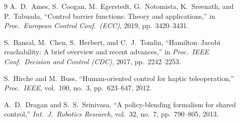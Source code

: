\documentclass[conference,letterpaper,10pt]{IEEEtran}
\begin{document}
\begin{thebibliography}{9}
  A.~D.~Ames, S.~Coogan, M.~Egerstedt, G.~Notomista, K.~Sreenath, and
  P.~Tabuada, ``Control barrier functions: Theory and applications,'' in
  \emph{Proc.\ European Control Conf.\ (ECC)}, 2019, pp.~3420--3431.

  S.~Bansal, M.~Chen, S.~Herbert, and C.~J.~Tomlin,
  ``Hamilton--Jacobi reachability: A brief overview and recent advances,''
  in \emph{Proc.\ IEEE Conf.\ Decision and Control (CDC)}, 2017, pp.~2242--2253.

  S.~Hirche and M.~Buss, ``Human-oriented control for haptic
  teleoperation,'' \emph{Proc.\ IEEE}, vol.~100, no.~3, pp.~623--647, 2012.

  A.~D.~Dragan and S.~S.~Srinivasa, ``A policy-blending formalism for
  shared control,'' \emph{Int.\ J.\ Robotics Research}, vol.~32, no.~7,
  pp.~790--805, 2013.

\end{thebibliography}
\end{document}
